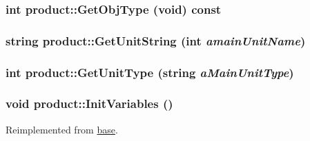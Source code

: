 \label{classproduct_a28d4c7421c7991066be1399f8b924116}
\hypertarget{classproduct_a40d4aad85cc18137f74782e0cafe0df5}{
\subsubsection[{GetObjType}]{\setlength{\rightskip}{0pt plus 5cm}int product::GetObjType (void) const}}
\label{classproduct_a40d4aad85cc18137f74782e0cafe0df5}
\hypertarget{classproduct_abd6e5f2d134fc6035418741240e3f40e}{
\subsubsection[{GetUnitString}]{\setlength{\rightskip}{0pt plus 5cm}string product::GetUnitString (int {\em amainUnitName})}}
\label{classproduct_abd6e5f2d134fc6035418741240e3f40e}
\hypertarget{classproduct_ab4131ddca9cae217890cfbd347e003d2}{
\subsubsection[{GetUnitType}]{\setlength{\rightskip}{0pt plus 5cm}int product::GetUnitType (string {\em aMainUnitType})}}
\label{classproduct_ab4131ddca9cae217890cfbd347e003d2}
\hypertarget{classproduct_afcbfb1feadfd4ed057845eab47e37ff5}{
\subsubsection[{InitVariables}]{\setlength{\rightskip}{0pt plus 5cm}void product::InitVariables ()}}
\label{classproduct_afcbfb1feadfd4ed057845eab47e37ff5}


Reimplemented from \hyperlink{classbase_ad2f5f5c9ec517641f63e52646cf49ad9}{base}.

